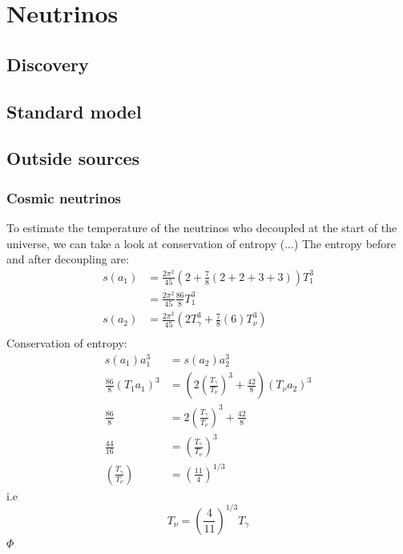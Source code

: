 \documentclass[11pt,a4paper,faculty=we,language=en,doctype=report]{cls/ugent-doc}
\renewcommand{\ULthickness}{2pt} %
\begin{document}

\maketitle
\renewcommand{\ULthickness}{1pt}


{\hypersetup{hidelinks}\tableofcontents} %
\newpage


\chapter{Neutrinos}
\section{Discovery}
\section{Standard model}
\section{Outside sources}
\subsection{Cosmic neutrinos}
To estimate the temperature of the neutrinos who decoupled at the start of the universe, we can take a look at conservation of entropy \cite{Dodelson}
(...)
The entropy before and after decoupling are:
\begin{align}
	s(a_1) &= \frac{2\pi^2}{45}(2 + \frac{7}{8}(2+2+3+3))T_1^3\\
	&= \frac{2\pi^2}{45}\frac{86}{8}T_1^3\\
	s(a_2) &= \frac{2\pi^2}{45}(2T_\gamma^3 + \frac{7}{8}(6)T_\nu^3)\\
\end{align}
Conservation of entropy:
\begin{align}
	s(a_1)a_1^3 &= s(a_2)a_2^3\\
	\frac{86}{8}(T_1 a_1)^3 &= \left(2\left(\frac{T_\gamma}{T_\nu}\right)^3 + \frac{42}{8}\right)(T_\nu a_2)^3\\
	\frac{86}{8} &= 2\left(\frac{T_\gamma}{T_\nu}\right)^3 + \frac{42}{8}\\
	\frac{44}{16} &= \left(\frac{T_\gamma}{T_\nu}\right)^3\\
	\left(\frac{T_\gamma}{T_\nu}\right) &= \left(\frac{11}{4}\right)^{1/3}
\end{align}
i.e
\begin{equation}
	T_\nu = \left(\frac{4}{11}\right)^{1/3}T_\gamma
\end{equation}
$\Phi$
\end{document}
